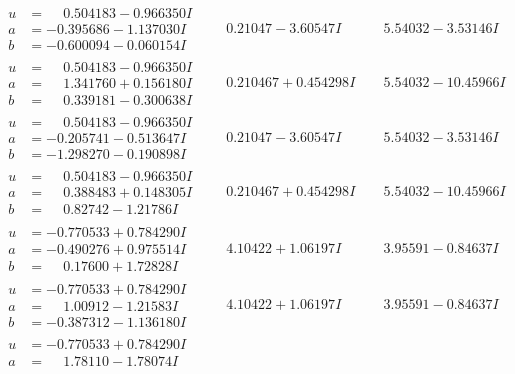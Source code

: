 \documentclass[1p]{elsarticle_modified}
\theoremstyle{definition}
\begin{document}
$$\begin{array}{c|c|c}
\begin{aligned}
u &= \phantom{-}0.504183 - 0.966350 I \\
a &= -0.395686 - 1.137030 I \\
b &= -0.600094 - 0.060154 I\end{aligned}
 & \phantom{-}0.21047 - 3.60547 I & \phantom{-}5.54032 - 3.53146 I \\ \hline\begin{aligned}
u &= \phantom{-}0.504183 - 0.966350 I \\
a &= \phantom{-}1.341760 + 0.156180 I \\
b &= \phantom{-}0.339181 - 0.300638 I\end{aligned}
 & \phantom{-}0.210467 + 0.454298 I & \phantom{-}5.54032 - 10.45966 I \\ \hline\begin{aligned}
u &= \phantom{-}0.504183 - 0.966350 I \\
a &= -0.205741 - 0.513647 I \\
b &= -1.298270 - 0.190898 I\end{aligned}
 & \phantom{-}0.21047 - 3.60547 I & \phantom{-}5.54032 - 3.53146 I \\ \hline\begin{aligned}
u &= \phantom{-}0.504183 - 0.966350 I \\
a &= \phantom{-}0.388483 + 0.148305 I \\
b &= \phantom{-}0.82742 - 1.21786 I\end{aligned}
 & \phantom{-}0.210467 + 0.454298 I & \phantom{-}5.54032 - 10.45966 I \\ \hline\begin{aligned}
u &= -0.770533 + 0.784290 I \\
a &= -0.490276 + 0.975514 I \\
b &= \phantom{-}0.17600 + 1.72828 I\end{aligned}
 & \phantom{-}4.10422 + 1.06197 I & \phantom{-}3.95591 - 0.84637 I \\ \hline\begin{aligned}
u &= -0.770533 + 0.784290 I \\
a &= \phantom{-}1.00912 - 1.21583 I \\
b &= -0.387312 - 1.136180 I\end{aligned}
 & \phantom{-}4.10422 + 1.06197 I & \phantom{-}3.95591 - 0.84637 I \\ \hline\begin{aligned}
u &= -0.770533 + 0.784290 I \\
a &= \phantom{-}1.78110 - 1.78074 I \\

\end{aligned}
\end{array}$$
\end{document}

